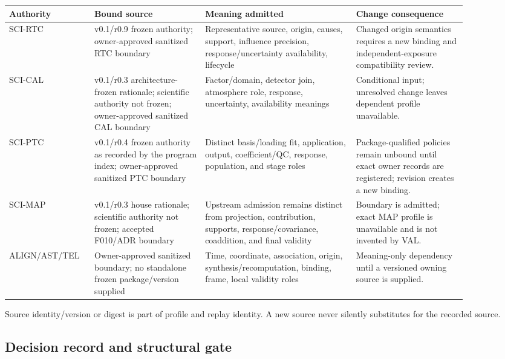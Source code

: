 \begin{center}
\begin{longtable}{@{}p{0.14\linewidth}p{0.22\linewidth}p{0.30\linewidth}p{0.22\linewidth}@{}}
\toprule
Authority & Bound source & Meaning admitted & Change consequence \\
\midrule
\endhead
SCI-RTC & v0.1/r0.9 frozen authority; owner-approved sanitized RTC boundary &
Representative source, origin, causes, support, influence precision,
response/uncertainty availability, lifecycle & Changed origin semantics
requires a new binding and independent-exposure compatibility review. \\
SCI-CAL & v0.1/r0.3 architecture-frozen rationale; scientific authority not
frozen; owner-approved sanitized CAL boundary & Factor/domain, detector join,
atmosphere role, response, uncertainty, availability meanings & Conditional
input; unresolved change leaves dependent profile unavailable. \\
SCI-PTC & v0.1/r0.4 frozen authority as recorded by the program index;
owner-approved sanitized PTC boundary & Distinct basis/loading fit,
application, output, coefficient/QC, response, population, and stage roles &
Package-qualified policies remain unbound until exact owner records are
registered; revision creates a new binding. \\
SCI-MAP & v0.1/r0.3 house rationale; scientific authority not frozen;
accepted F010/ADR boundary & Upstream admission remains distinct from
projection, contribution, supports, response/covariance, coaddition, and final
validity & Boundary is admitted; exact MAP profile is unavailable and is not
invented by VAL. \\
ALIGN/\allowbreak AST/\allowbreak TEL & Owner-approved sanitized boundary; no standalone frozen
package/version supplied & Time, coordinate, association, origin,
synthesis/recomputation, binding, frame, local validity roles & Meaning-only
dependency until a versioned owning source is supplied. \\
\bottomrule
\end{longtable}
\end{center}

Source identity/version or digest is part of profile and replay identity. A
new source never silently substitutes for the recorded source.

\subsection{Decision record and structural gate}

